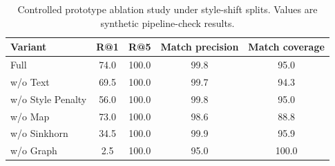 \begin{table}[t]
\centering
\caption{Controlled prototype ablation study under style-shift splits. Values are synthetic pipeline-check results.}
\label{tab:controlled_ablation}
\begin{tabular}{lcccc}
\toprule
Variant & R@1 & R@5 & Match precision & Match coverage \\
\midrule
Full & 74.0 & 100.0 & 99.8 & 95.0 \\
w/o Text & 69.5 & 100.0 & 99.7 & 94.3 \\
w/o Style Penalty & 56.0 & 100.0 & 99.8 & 95.0 \\
w/o Map & 73.0 & 100.0 & 98.6 & 88.8 \\
w/o Sinkhorn & 34.5 & 100.0 & 99.9 & 95.9 \\
w/o Graph & 2.5 & 100.0 & 95.0 & 100.0 \\
\bottomrule
\end{tabular}
\end{table}
